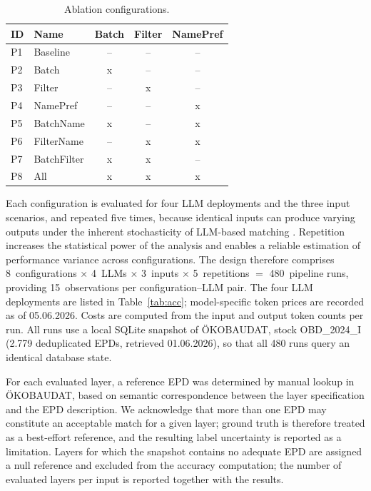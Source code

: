\documentclass[10pt, a4paper, twocolumn]{article}
\begin{document}
\begin{table}[htbp]
  \caption{Ablation configurations.}
  \label{tab:ablation}
  \centering
  \small
  \begin{tabular}{llccc}
    \toprule
    \textbf{ID} & \textbf{Name} & \textbf{Batch} & \textbf{Filter} & \textbf{NamePref} \\
    \midrule
    P1 & Baseline    & --  & --  & --  \\
    P2 & Batch       & x   & --  & --  \\
    P3 & Filter      & --  & x   & --  \\
    P4 & NamePref    & --  & --  & x   \\
    P5 & BatchName   & x   & --  & x   \\
    P6 & FilterName  & --  & x   & x   \\
    P7 & BatchFilter & x   & x   & --  \\
    P8 & All         & x   & x   & x   \\
    \bottomrule
  \end{tabular}
\end{table}

Each configuration is evaluated for four LLM deployments and the three input scenarios,
and repeated five times, because identical inputs can produce varying outputs under the
inherent stochasticity of LLM-based matching \cite{Fostiropoulos.2023}. Repetition
increases the statistical power of the analysis and enables a reliable estimation of
performance variance across configurations. The design therefore comprises
8~configurations $\times$ 4~LLMs $\times$ 3~inputs $\times$ 5~repetitions $=$
480~pipeline runs, providing 15~observations per configuration--LLM pair. The four LLM deployments are listed in Table~\ref{tab:acc}; 
model-specific token prices are recorded as of 05.06.2026\@.
Costs are computed from the input and output token counts per run.
All runs use a local SQLite snapshot of ÖKOBAUDAT, stock OBD\_2024\_I (2.779 deduplicated EPDs, retrieved 01.06.2026), so that all 480 runs query an identical database state.

For each evaluated layer, a reference EPD was determined by manual lookup in
\"OKOBAUDAT, based on semantic correspondence between the layer specification and the
EPD description. We acknowledge that more than one EPD may constitute an acceptable
match for a given layer; ground truth is therefore treated as a best-effort reference,
and the resulting label uncertainty is reported as a limitation. 
Layers for which the snapshot contains no adequate EPD are assigned a null reference and
excluded from the accuracy computation; the number of evaluated layers per input is
reported together with the results.
\end{document}
